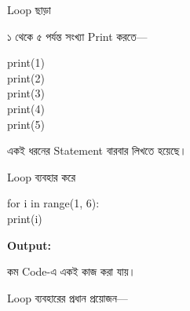 \noindent
\begin{minipage}[t]{0.49\linewidth}

\begin{sideexamplebox}{Loop ছাড়া}

১ থেকে ৫ পর্যন্ত সংখ্যা Print করতে—

\begin{sidecodebox}
\begin{english}
\ttfamily
print(1)\\
print(2)\\
print(3)\\
print(4)\\
print(5)
\end{english}
\end{sidecodebox}

একই ধরনের Statement বারবার লিখতে হয়েছে।

\end{sideexamplebox}

\end{minipage}
\hfill
\begin{minipage}[t]{0.49\linewidth}

\begin{sideexamplebox}{Loop ব্যবহার করে}

\begin{sidecodebox}
\begin{english}
\ttfamily
for i in range(1, 6):\\
\hspace*{4mm}print(i)
\end{english}
\end{sidecodebox}

\textbf{Output:}

\begin{center}
\textenglish{    }
\end{center}

কম Code-এ একই কাজ করা যায়।

\end{sideexamplebox}

\end{minipage}



Loop ব্যবহারের প্রধান প্রয়োজন—

